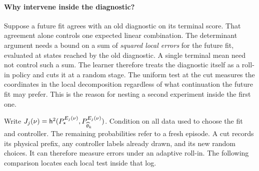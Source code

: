\paragraph{Why intervene inside the diagnostic?}
Suppose a future fit agrees with an old diagnostic on its terminal score. That agreement alone controls one expected linear combination. The determinant argument needs a bound on a sum of \emph{squared local errors} for the future fit, evaluated at states reached by the old diagnostic. A single terminal mean need not control such a sum. The learner therefore treats the diagnostic itself as a roll-in policy and cuts it at a random stage. The uniform test at the cut measures the coordinates in the local decomposition regardless of what continuation the future fit may prefer. This is the reason for nesting a second experiment inside the first one.

Write $J_j(\nu)=\mathsf h^2(P_\star^{E_j(\nu)},P_{\widehat\theta_k}^{E_j(\nu)})$. Condition on all data used to choose the fit and controller. The remaining probabilities refer to a fresh episode. A cut records its physical prefix, any controller labels already drawn, and its new random choices. It can therefore measure errors under an adaptive roll-in. The following comparison locates each local test inside that log.

